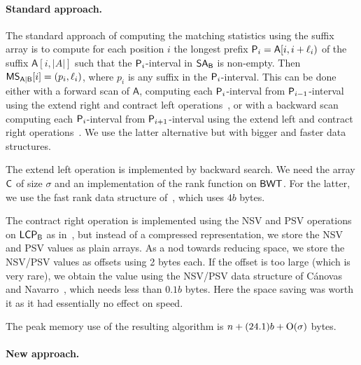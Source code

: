 \documentclass[runningheads]{llncs}
\def\BWT{\mbox{\rm L}}
\def\SA{\mbox{\rm {\sf SA}}}
\def\MS{\mbox{\rm {\sf MS}}}
\def\B{\textsf{B}}
\def\A{\textsf{A}}
\def\Pr{\mbox{\rm {\sf P}}}
\def\C{\mbox{\rm {\sf C}}}
\def\BWT{\mbox{\rm {\sf BWT}}}
\def\LCP{\mbox{\rm {\sf LCP}}}
\def\O{\mbox{\rm O}}
\begin{document}
\paragraph{Standard  approach.}

The standard approach of computing the matching statistics using the
suffix array is to compute for each position $i$ the longest prefix
$\Pr_i=\A[i,i+\ell_i)$ of the suffix $\A[i,|A|]$ such that the
$\Pr_i$-interval in $\SA_{\B}$ is non-empty. Then
$\MS_{\A|\B}[i]=(p_i,\ell_i)$, where $p_i$ is any suffix in the
$\Pr_i$-interval.  This can be done either with a forward scan of
$\A$, computing each $\Pr_i$-interval from $\Pr_{i-1}$-interval using
the extend right and contract left operations~\cite{ako2004}, or with
a backward scan computing each $\Pr_i$-interval from
$\Pr_{i+1}$-interval using the extend left and contract right
operations~\cite{og2011}.  We use the latter alternative but with
bigger and faster data structures.

The extend left operation is implemented by backward search. We need
the array $\C$ of size $\sigma$ and an implementation of the rank
function on $\BWT$. For the latter, we use the fast
rank data structure of~\cite{fgm2012}, which uses $4b$ bytes.

The contract right operation is implemented using the NSV and PSV
operations on $\LCP_{\B}$ as in~\cite{og2011}, but instead of a
compressed representation, we store the NSV and PSV values as plain
arrays. As a nod towards reducing space, we store the NSV/PSV values
as offsets using 2 bytes each. If the offset is too large (which is
very rare), we obtain the value using the NSV/PSV data structure of
C{\'a}novas and Navarro~\cite{cn2010}, which needs less than $0.1b$ bytes.
Here the space saving was worth it as it had essentially no effect on
speed.

The peak memory use of the resulting algorithm is
$n+(24.1)b+\O(\sigma)$ bytes.

\paragraph{New approach.}
\end{document}
